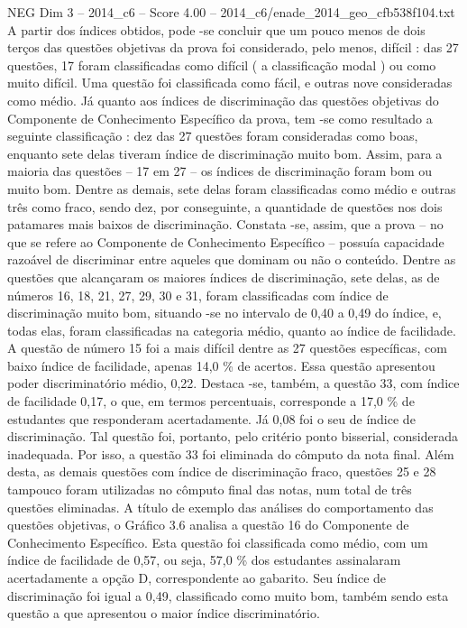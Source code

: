 \begin{textsample}{NEG Dim 3 – 2014\_c6 – Score 4.00 – 2014\_c6/enade\_2014\_geo\_cfb538f104.txt}
A partir dos índices obtidos, pode -se concluir que um pouco menos de dois terços das questões objetivas da prova foi considerado, pelo menos, difícil : das 27 questões, 17 foram classificadas como difícil ( a classificação modal ) ou como muito difícil.
Uma questão foi classificada como fácil, e outras nove consideradas como médio.
Já quanto aos índices de discriminação das questões objetivas do Componente de Conhecimento Específico da prova, tem -se como resultado a seguinte classificação : dez das 27 questões foram consideradas como boas, enquanto sete delas tiveram índice de discriminação muito bom.
Assim, para a maioria das questões – 17 em 27 – os índices de discriminação foram bom ou muito bom.
Dentre as demais, sete delas foram classificadas como médio e outras três como fraco, sendo dez, por conseguinte, a quantidade de questões nos dois patamares mais baixos de discriminação.
Constata -se, assim, que a prova – no que se refere ao Componente de Conhecimento Específico – possuía capacidade razoável de discriminar entre aqueles que dominam ou não o conteúdo.
Dentre as questões que alcançaram os maiores índices de discriminação, sete delas, as de números 16, 18, 21, 27, 29, 30 e 31, foram classificadas com índice de discriminação muito bom, situando -se no intervalo de 0,40 a 0,49 do índice, e, todas elas, foram classificadas na categoria médio, quanto ao índice de facilidade.
A questão de número 15 foi a mais difícil dentre as 27 questões específicas, com baixo índice de facilidade, apenas 14,0 \% de acertos.
Essa questão apresentou poder discriminatório médio, 0,22.
Destaca -se, também, a questão 33, com índice de facilidade 0,17, o que, em termos percentuais, corresponde a 17,0 \% de estudantes que responderam acertadamente.
Já 0,08 foi o seu de índice de discriminação.
Tal questão foi, portanto, pelo critério ponto bisserial, considerada inadequada.
Por isso, a questão 33 foi eliminada do cômputo da nota final.
Além desta, as demais questões com índice de discriminação fraco, questões 25 e 28 tampouco foram utilizadas no cômputo final das notas, num total de três questões eliminadas.
A título de exemplo das análises do comportamento das questões objetivas, o Gráfico 3.6 analisa a questão 16 do Componente de Conhecimento Específico.
Esta questão foi classificada como médio, com um índice de facilidade de 0,57, ou seja, 57,0 \% dos estudantes assinalaram acertadamente a opção D, correspondente ao gabarito.
Seu índice de discriminação foi igual a 0,49, classificado como muito bom, também sendo esta questão a que apresentou o maior índice discriminatório.

\end{textsample}
